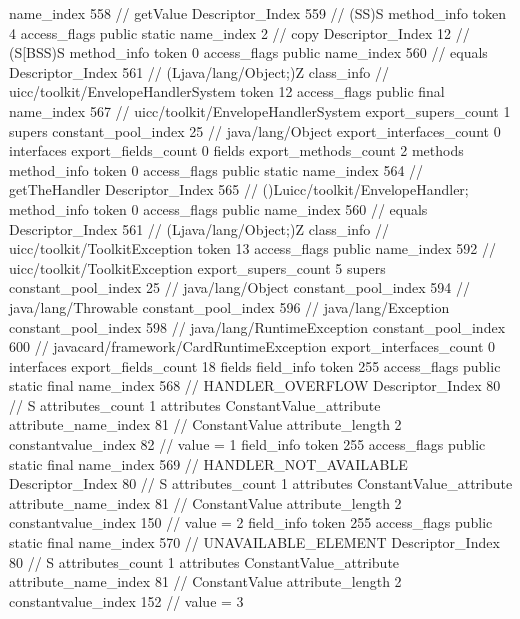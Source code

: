 {{{{{					name_index	558		// getValue
					Descriptor_Index	559		// (SS)S
				}
				method_info {
					token	4
					access_flags	public static
					name_index	2		// copy
					Descriptor_Index	12		// (S[BSS)S
				}
				method_info {
					token	0
					access_flags	public
					name_index	560		// equals
					Descriptor_Index	561		// (Ljava/lang/Object;)Z
				}
			}
		}
		class_info {		// uicc/toolkit/EnvelopeHandlerSystem
			token	12
			access_flags	public final
			name_index	567		// uicc/toolkit/EnvelopeHandlerSystem
			export_supers_count	1
			supers {
				constant_pool_index	25		// java/lang/Object
			}
			export_interfaces_count	0
			interfaces {
			}
			export_fields_count	0
			fields {
			}
			export_methods_count	2
			methods {
				method_info {
					token	0
					access_flags	public static
					name_index	564		// getTheHandler
					Descriptor_Index	565		// ()Luicc/toolkit/EnvelopeHandler;
				}
				method_info {
					token	0
					access_flags	public
					name_index	560		// equals
					Descriptor_Index	561		// (Ljava/lang/Object;)Z
				}
			}
		}
		class_info {		// uicc/toolkit/ToolkitException
			token	13
			access_flags	public
			name_index	592		// uicc/toolkit/ToolkitException
			export_supers_count	5
			supers {
				constant_pool_index	25		// java/lang/Object
				constant_pool_index	594		// java/lang/Throwable
				constant_pool_index	596		// java/lang/Exception
				constant_pool_index	598		// java/lang/RuntimeException
				constant_pool_index	600		// javacard/framework/CardRuntimeException
			}
			export_interfaces_count	0
			interfaces {
			}
			export_fields_count	18
			fields {
			field_info {
				token	255
				access_flags	public static final
				name_index	568		// HANDLER_OVERFLOW
				Descriptor_Index	80		// S
				attributes_count	1
				attributes {
				ConstantValue_attribute {
					attribute_name_index	81		// ConstantValue
					attribute_length	2
					constantvalue_index	82		// value = 1
				}
				}
			}
			field_info {
				token	255
				access_flags	public static final
				name_index	569		// HANDLER_NOT_AVAILABLE
				Descriptor_Index	80		// S
				attributes_count	1
				attributes {
				ConstantValue_attribute {
					attribute_name_index	81		// ConstantValue
					attribute_length	2
					constantvalue_index	150		// value = 2
				}
				}
			}
			field_info {
				token	255
				access_flags	public static final
				name_index	570		// UNAVAILABLE_ELEMENT
				Descriptor_Index	80		// S
				attributes_count	1
				attributes {
				ConstantValue_attribute {
					attribute_name_index	81		// ConstantValue
					attribute_length	2
					constantvalue_index	152		// value = 3
}}}}}}}

